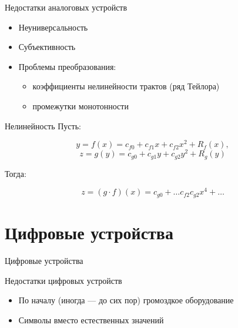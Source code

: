 \documentclass[xetex,aspectratio=43]{beamer}
\begin{document}
\begin{frame}{Недостатки аналоговых устройств}
	\begin{itemize}
		
		\item
		Неуниверсальность
		\item
		Субъективность
		\item
		Проблемы преобразования:
		
		\begin{itemize}
			
			\item
			коэффициенты нелинейности трактов (ряд Тейлора)
			\item
			промежутки монотонности
		\end{itemize}
	\end{itemize}
\end{frame}

\begin{frame}{Нелинейность}
	Пусть:
	
	\[y = f(x) = c_{f0} + c_{f1} x + c_{f2} x^2 + R_f(x),\]
	\[z = g(y) = c_{g0} + c_{g1} y + c_{g2} y^2 + R_g(y)\]
	
	Тогда:
	
	\[ z = (g\cdot f)(x) = c_{g0} + \dots c_{f2} c_{g2} x^4 + \dots \]
	
	\begin{center}
		
	\end{center}
\end{frame}

\section{Цифровые устройства}

\begin{frame}{Цифровые устройства}
\end{frame}

\begin{frame}{Недостатки цифровых устройств}
	\begin{itemize}
		
		\item
		По началу (иногда --- до сих пор) громоздкое оборудование
		\item
		Символы вместо естественных значений
	\end{itemize}
\end{frame}
	
\end{document}
